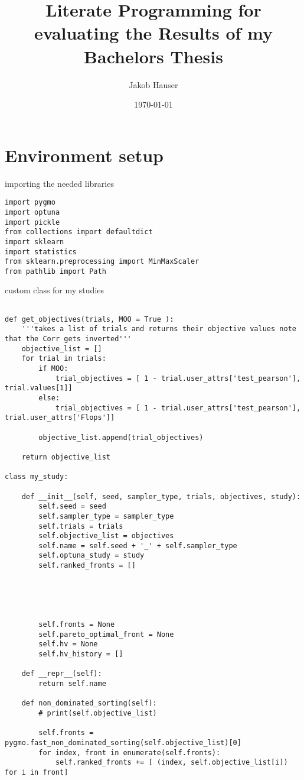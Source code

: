 \documentclass[11pt]{article}
\author{Jakob Hauser}
\date{\today}
\title{Literate Programming for evaluating the Results of my Bachelors Thesis}
\begin{document}
\maketitle
\tableofcontents

\section{Environment setup}
\label{sec:org1603b74}
importing the needed libraries
\begin{verbatim}
import pygmo
import optuna
import pickle
from collections import defaultdict
import sklearn
import statistics
from sklearn.preprocessing import MinMaxScaler
from pathlib import Path
\end{verbatim}

custom class for my studies
\begin{verbatim}

def get_objectives(trials, MOO = True ):
    '''takes a list of trials and returns their objective values note that the Corr gets inverted'''
    objective_list = []
    for trial in trials:
        if MOO:
            trial_objectives = [ 1 - trial.user_attrs['test_pearson'], trial.values[1]]
        else:
            trial_objectives = [ 1 - trial.user_attrs['test_pearson'], trial.user_attrs['Flops']]

        objective_list.append(trial_objectives)

    return objective_list

class my_study:

    def __init__(self, seed, sampler_type, trials, objectives, study):
        self.seed = seed
        self.sampler_type = sampler_type
        self.trials = trials
        self.objective_list = objectives
        self.name = self.seed + '_' + self.sampler_type
        self.optuna_study = study
        self.ranked_fronts = []





        self.fronts = None
        self.pareto_optimal_front = None
        self.hv = None
        self.hv_history = []

    def __repr__(self):
        return self.name

    def non_dominated_sorting(self):
        # print(self.objective_list)

        self.fronts = pygmo.fast_non_dominated_sorting(self.objective_list)[0]
        for index, front in enumerate(self.fronts):
            self.ranked_fronts += [ (index, self.objective_list[i]) for i in front]






\end{verbatim}
\end{document}
